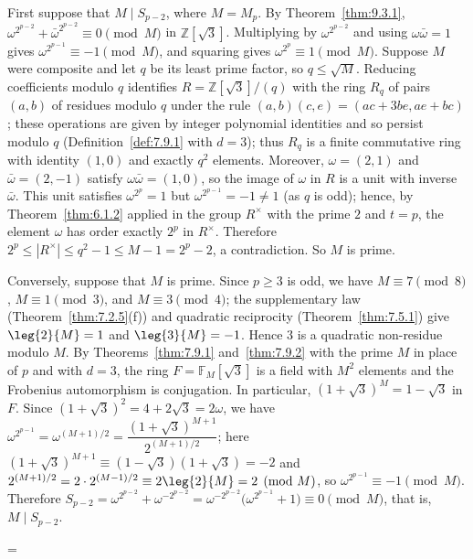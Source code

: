 \documentclass[11pt]{article}
\makeatletter
\theoremstyle{ntstyle}
\let\nt@closedisplay\]
\def\nt@guardedclose{\@ifnextchar\par{\nt@closeafterpar}{\@ifnextchar\end{\postdisplaypenalty\@M\nt@closedisplay}{\nt@closedisplay}}}
\def\nt@closeafterpar\par{\@ifnextchar\par{\nt@closeafterpar}{\@ifnextchar\end{\postdisplaypenalty\@M\nt@closedisplay\par}{\nt@closedisplay\par}}}
\renewenvironment{proof}[1][\proofname]{\par
  \pushQED{\qed}\normalfont\topsep\medskipamount\edef\nt@afterproof{\@endparpenalty=\the\@endparpenalty\relax}\@beginparpenalty\@M\@endparpenalty\@M\let\]\nt@guardedclose\trivlist\item[]\textit{#1\@addpunct{.}} \ignorespaces}{\ifvmode\addpenalty\@M\fi\popQED\nt@afterproof\endtrivlist\@endpefalse}
\makeatother
\begin{document}
\begin{proof} First suppose that $M\mid S_{p-2}$, where $M=M_p$.
	By Theorem~\ref{thm:9.3.1},
	$\omega^{2^{p-2}}+\bar\omega^{2^{p-2}}\equiv0\pmod{M}$ in
	$\mathbb{Z}[\sqrt{3}]$. Multiplying by $\omega^{2^{p-2}}$ and using
	$\omega\bar\omega=1$ gives $\omega^{2^{p-1}}\equiv-1\pmod{M}$, and
	squaring gives $\omega^{2^{p}}\equiv1\pmod{M}$. Suppose $M$ were
	composite and let $q$ be its least prime factor, so $q\le\sqrt{M}$.
	Reducing coefficients modulo $q$ identifies
	$R=\mathbb{Z}[\sqrt{3}]/(q)$ with the ring $R_q$ of pairs $(a,b)$ of
	residues modulo $q$ under the rule $(a,b)(c,e)=(ac+3be,ae+bc)$; these
	operations are given by integer polynomial identities and so persist modulo $q$
	(Definition~\ref{def:7.9.1} with $d=3$); thus $R_q$ is a finite commutative
	ring with identity $(1,0)$ and exactly $q^{2}$ elements.
	Moreover, $\omega=(2,1)$ and $\bar\omega=(2,-1)$ satisfy
	$\omega\bar\omega=(1,0)$, so the image of $\omega$ in $R$ is a unit with inverse $\bar\omega$. This
	unit satisfies $\omega^{2^{p}}=1$ but $\omega^{2^{p-1}}=-1\neq1$ (as
	$q$ is odd); hence, by Theorem~\ref{thm:6.1.2} applied in the group $R^{\times}$ with
	the prime $2$ and $t=p$, the element $\omega$ has order exactly $2^{p}$ in
	$R^{\times}$.
	Therefore $2^{p}\le|R^{\times}|\le q^2-1\le M-1=2^{p}-2$, a contradiction. So $M$ is prime.

	Conversely, suppose that $M$ is prime. Since
	$p\ge3$ is odd, we have $M\equiv7\pmod{8}$, $M\equiv1\pmod{3}$, and
	$M\equiv3\pmod{4}$; the supplementary law (Theorem~\ref{thm:7.2.5}(f)) and
	quadratic reciprocity (Theorem~\ref{thm:7.5.1})
	give $\leg{2}{M}=1$ and $\leg{3}{M}=-1$. Hence
	$3$ is a quadratic non-residue modulo $M$. By
	Theorems~\ref{thm:7.9.1} and~\ref{thm:7.9.2} with the prime $M$ in place of $p$ and with $d=3$,
	the ring $F=\mathbb{F}_M[\sqrt{3}]$ is a field with $M^2$ elements and the
	Frobenius automorphism is conjugation. In particular,
	$(1+\sqrt{3})^{M}=1-\sqrt{3}$ in $F$. Since
	$(1+\sqrt{3})^2=4+2\sqrt{3}=2\omega$,
	we have $\omega^{2^{p-1}}=\omega^{(M+1)/2}=\dfrac{(1+\sqrt{3})^{M+1}}{2^{(M+1)/2}}$;
	here $(1+\sqrt{3})^{M+1}\equiv(1-\sqrt{3})(1+\sqrt{3})=-2$ and
	$2^{(M+1)/2}=2\cdot2^{(M-1)/2}\equiv2\leg{2}{M}=2\pmod{M}$,
	so $\omega^{2^{p-1}}\equiv-1\pmod{M}$. Therefore
	$S_{p-2}=\omega^{2^{p-2}}+\omega^{-2^{p-2}}=\omega^{-2^{p-2}}\big(\omega^{2^{p-1}}+1\big)\equiv0\pmod{M}$, that is, $M\mid S_{p-2}$.

\end{proof}
\end{document}
